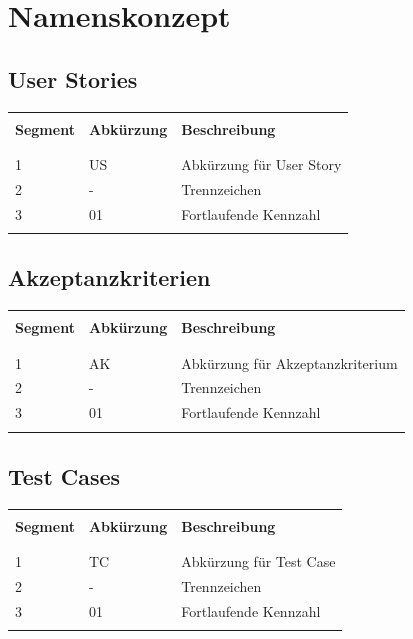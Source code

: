 \section{Namenskonzept}
\subsection{User Stories}
\begin{table}[htp]
  \begin{tabularx}{\textwidth}{l l X}\hline \\
  \textbf{Segment} & \textbf{Abkürzung} & \textbf{Beschreibung} \\ \\\hline \\
  1 & US & Abkürzung für User Story \\
  2 & - & Trennzeichen \\
  3 & 01 & Fortlaufende Kennzahl \\
  \\\hline
  \end{tabularx}
\end{table}
\subsection{Akzeptanzkriterien}
\begin{table}[htp]
  \begin{tabularx}{\textwidth}{l l X}\hline \\
    \textbf{Segment} & \textbf{Abkürzung} & \textbf{Beschreibung} \\ \\\hline \\
    1 & AK & Abkürzung für Akzeptanzkriterium \\
    2 & - & Trennzeichen \\
    3 & 01 & Fortlaufende Kennzahl \\
    \\\hline
  \end{tabularx}
\end{table}
\subsection{Test Cases}
\begin{table}[htp]
  \begin{tabularx}{\textwidth}{l l X}\hline \\
  \textbf{Segment} & \textbf{Abkürzung} & \textbf{Beschreibung} \\ \\\hline \\
  1 & TC & Abkürzung für Test Case \\
  2 & - & Trennzeichen \\
  3 & 01 & Fortlaufende Kennzahl \\
  \\\hline
  \end{tabularx}
\end{table}
